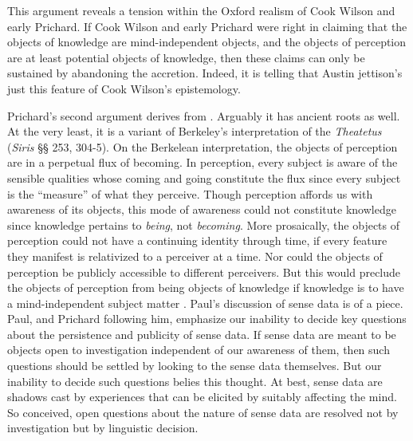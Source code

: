 This argument reveals a tension within the Oxford realism of Cook Wilson and early Prichard. If Cook Wilson and early Prichard were right in claiming that the objects of knowledge are mind-independent objects, and the objects of perception are at least potential objects of knowledge, then these claims can only be sustained by abandoning the accretion. Indeed, it is telling that Austin jettison's just this feature of Cook Wilson's epistemology.

Prichard's second argument derives from \citet{Paul:1936kd}. Arguably it has ancient roots as well. At the very least, it is a variant of Berkeley's interpretation of the \emph{Theatetus} (\emph{Siris} §§ 253, 304-5). On the Berkelean interpretation, the objects of perception are in a perpetual flux of becoming. In perception, every subject is aware of the sensible qualities whose coming and going constitute the flux since every subject is the ``measure'' of what they perceive. Though perception affords us with awareness of its objects, this mode of awareness could not constitute knowledge since knowledge pertains to \emph{being}, not \emph{becoming}. More prosaically, the objects of perception could not have a continuing identity through time, if every feature they manifest is relativized to a perceiver at a time. Nor could the objects of perception be publicly accessible to different perceivers. But this would preclude the objects of perception from being objects of knowledge if knowledge is to have a mind-independent subject matter \citep[see][for further discussion of the Berkelean interpretation]{Burnyeat:1990dp}. Paul's discussion of sense data is of a piece. Paul, and Prichard following him, emphasize our inability to decide key questions about the persistence and publicity of sense data. If sense data are meant to be objects open to investigation independent of our awareness of them, then such questions should be settled by looking to the sense data themselves. But our inability to decide such questions belies this thought. At best, sense data are shadows cast by experiences that can be elicited by suitably affecting the mind. So conceived, open questions about the nature of sense data are resolved not by investigation but by linguistic decision. %

